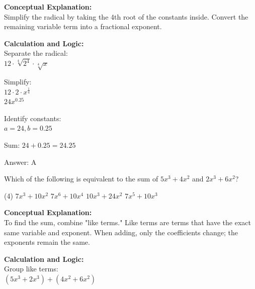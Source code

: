 \documentclass[11pt,paper=a4,answers]{exam}
\begin{document}
\begin{questions}
\begin{solution}
\textbf{Conceptual Explanation:} \\
Simplify the radical by taking the 4th root of the constants inside. Convert the remaining variable term into a fractional exponent.

\vspace{20pt}

\textbf{Calculation and Logic:} \\
Separate the radical: \\
$12 \cdot \sqrt[4]{2^4} \cdot \sqrt[4]{x}$

\vspace{10pt}

Simplify: \\
$12 \cdot 2 \cdot x^{\frac{1}{4}}$ \\
$24x^{0.25}$

\vspace{10pt}

Identify constants: \\
$a = 24, b = 0.25$

\vspace{10pt}

Sum: $24 + 0.25 = 24.25$

\vspace{25pt}

Answer: \colorbox{yellow!100}{A}
\end{solution}

\question
Which of the following is equivalent to the sum of $5x^3 + 4x^2$ and $2x^3 + 6x^2$?
\begin{tasks}(4)
    \task $7x^3 + 10x^2$
    \task $7x^6 + 10x^4$
    \task $10x^3 + 24x^2$
    \task $7x^5 + 10x^3$
\end{tasks}

\begin{solution}
\textbf{Conceptual Explanation:} \\
To find the sum, combine "like terms." Like terms are terms that have the exact same variable and exponent. When adding, only the coefficients change; the exponents remain the same.

\vspace{20pt}

\textbf{Calculation and Logic:} \\
Group like terms: \\
$(5x^3 + 2x^3) + (4x^2 + 6x^2)$


\end{solution}
\end{questions}
\end{document}
